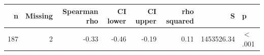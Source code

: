 \begingroup\footnotesize
\begin{tabular}{rrrrrrrl}
  \toprule
n & Missing & Spearman rho & CI lower & CI upper & rho squared & S & p \\ 
  \midrule
187 &   2 & -0.33 & -0.46 & -0.19 & 0.11 & 1453526.34 & $<$.001 \\ 
   \bottomrule
\end{tabular}
\endgroup

